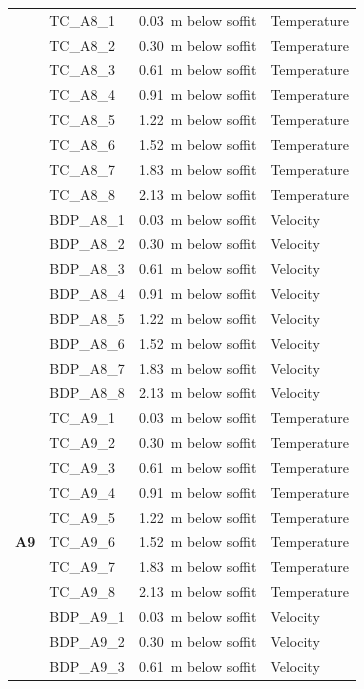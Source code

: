 \documentclass[12pt,oneside]{book}
\begin{document}
\begin{longtable}[c]{c|lll}
\bottomrule
\newpage
\multirow{16}{*}{\large{\textbf{A8}}}
 & TC\_A8\_1  & 0.03~m below soffit  & Temperature \\
 & TC\_A8\_2  & 0.30~m below soffit  & Temperature \\
 & TC\_A8\_3  & 0.61~m below soffit  & Temperature \\
 & TC\_A8\_4  & 0.91~m below soffit  & Temperature \\
 & TC\_A8\_5  & 1.22~m below soffit  & Temperature \\
 & TC\_A8\_6  & 1.52~m below soffit  & Temperature \\
 & TC\_A8\_7  & 1.83~m below soffit  & Temperature \\
 & TC\_A8\_8  & 2.13~m below soffit  & Temperature \\
\cline{2-4}
 & BDP\_A8\_1 & 0.03~m below soffit  & Velocity \\
 & BDP\_A8\_2 & 0.30~m below soffit  & Velocity \\
 & BDP\_A8\_3 & 0.61~m below soffit  & Velocity \\
 & BDP\_A8\_4 & 0.91~m below soffit  & Velocity \\
 & BDP\_A8\_5 & 1.22~m below soffit  & Velocity \\
 & BDP\_A8\_6 & 1.52~m below soffit  & Velocity \\
 & BDP\_A8\_7 & 1.83~m below soffit  & Velocity \\
 & BDP\_A8\_8 & 2.13~m below soffit  & Velocity \\
\midrule
\multirow{16}{*}{\large{\textbf{A9}}}
 & TC\_A9\_1  & 0.03~m below soffit  & Temperature \\
 & TC\_A9\_2  & 0.30~m below soffit  & Temperature \\
 & TC\_A9\_3  & 0.61~m below soffit  & Temperature \\
 & TC\_A9\_4  & 0.91~m below soffit  & Temperature \\
 & TC\_A9\_5  & 1.22~m below soffit  & Temperature \\
 & TC\_A9\_6  & 1.52~m below soffit  & Temperature \\
 & TC\_A9\_7  & 1.83~m below soffit  & Temperature \\
 & TC\_A9\_8  & 2.13~m below soffit  & Temperature \\
\cline{2-4}
 & BDP\_A9\_1 & 0.03~m below soffit  & Velocity \\
 & BDP\_A9\_2 & 0.30~m below soffit  & Velocity \\
 & BDP\_A9\_3 & 0.61~m below soffit  & Velocity \\

\end{longtable}
\end{document}
